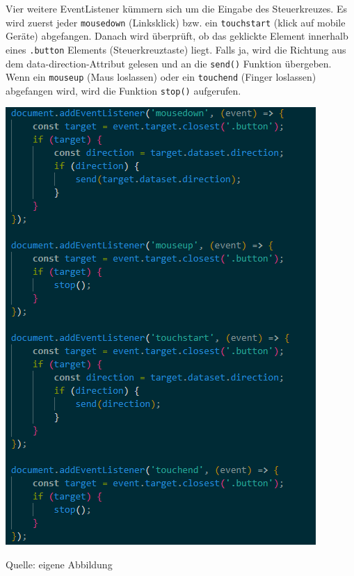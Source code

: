 \documentclass[ngerman,12pt,a4paper]{article}
\begin{document}
	Vier weitere EventListener kümmern sich um die Eingabe des Steuerkreuzes. Es wird zuerst jeder \texttt{mousedown} (Linksklick) bzw. ein \texttt{touchstart} (klick auf mobile Geräte) abgefangen. Danach wird überprüft, ob das geklickte Element innerhalb eines \texttt{.button} Elements (Steuerkreuztaste) liegt. Falls ja, wird die Richtung aus dem data-direction-Attribut gelesen und an die \texttt{send()} Funktion übergeben. Wenn ein \texttt{mouseup} (Maus loslassen) oder ein \texttt{touchend} (Finger loslassen) abgefangen wird, wird die Funktion \texttt{stop()} aufgerufen. 
	\begin{center}
		\begin{minipage}[t]{0.5\textwidth}
			\includegraphics[scale=0.7]{Pictures/Steuerung-js2}
			\label{fig:Steuerkreuz-js2}
			\vspace{-10pt}
			\begin{center}
				\par\small Quelle: eigene Abbildung 
			\end{center}
		\end{minipage} \\[0.75cm]
	\end{center}
\end{document}
